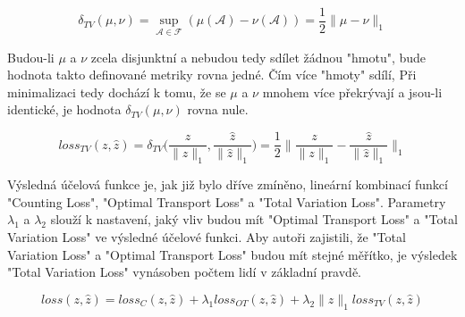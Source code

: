 \begin{equation}
\delta_{TV}(\mu, \nu) = \sup_{\mathcal{A} \in \mathcal{F}} (\mu(\mathcal{A}) - \nu(\mathcal{A})) = \frac{1}{2}\|\mu - \nu\|_1
\label{eq:total_variation}
\end{equation}

Budou-li \(\mu\) a \(\nu\) zcela disjunktní a nebudou tedy sdílet žádnou "hmotu", bude hodnota takto definované metriky rovna jedné.
Čím více "hmoty" sdílí, 
Při minimalizaci tedy dochází k tomu, že se \(\mu\) a \(\nu\) mnohem více překrývají a jsou-li identické, je hodnota \(\delta_{TV}(\mu, \nu)\) rovna nule.

\begin{equation}
loss_{TV}(z, \hat{z}) = \delta_{TV} \bigg( \frac{z}{\|z\|_1}, \frac{\hat{z}}{\|\hat{z}\|_1} \bigg)
= \frac{1}{2} \bigg\| \frac{z}{\|z\|_1} - \frac{\hat{z}}{\|\hat{z}\|_1} \bigg\|_1
\label{eq:tv_loss}
\end{equation}


Výsledná účelová funkce je, jak již bylo dříve zmíněno, lineární kombinací funkcí "Counting Loss",  "Optimal Transport Loss" a "Total Variation Loss". Parametry \(\lambda_1\) a \(\lambda_2\) slouží k nastavení, jaký vliv budou mít "Optimal Transport Loss" a "Total Variation Loss" ve výsledné účelové funkci.
Aby autoři zajistili, že "Total Variation Loss" a "Optimal Transport Loss" budou mít stejné měřítko, je výsledek "Total Variation Loss" vynásoben počtem lidí v základní pravdě.

\begin{equation}
loss(z, \hat{z}) = loss_{C}(z, \hat{z}) + \lambda_1 loss_{OT}(z, \hat{z}) + \lambda_2 \|z\|_1 loss_{TV}(z, \hat{z})
\label{eq:overall_loss}
\end{equation}



\endinput